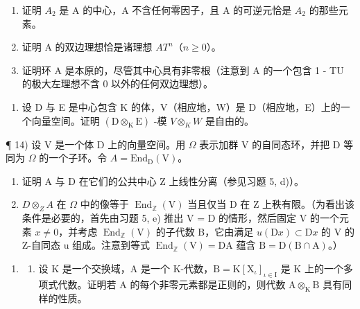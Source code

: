 \begin{enumerate}
\def\labelenumi{\alph{enumi})}
\item
  证明 \(A_{2}\) 是 A 的中心，A 不含任何零因子，且 A 的可逆元恰是 \(A_{2}\) 的那些元素。
\item
  证明 A 的双边理想恰是诸理想 \(AT^{n}\)（\(n \geqslant 0\)）。
\item
  证明环 A 是本原的，尽管其中心具有非零根（注意到 A 的一个包含 1 - TU 的极大左理想不含 0 以外的任何双边理想）。
\end{enumerate}

\begin{enumerate}
\def\labelenumi{\arabic{enumi})}
\setcounter{enumi}{12}
\tightlist
\item
  设 D 与 E 是中心包含 K 的体，V（相应地，W）是 D（相应地，E）上的一个向量空间。证明 \((\mathrm{D} \otimes_{\mathrm{K}} \mathrm{E})\) -模 \(V \otimes_{K} W\) 是自由的。
\end{enumerate}

¶ 14) 设 V 是一个体 D 上的向量空间。用 \(\Omega\) 表示加群 V 的自同态环，并把 D 等同为 \(\Omega\) 的一个子环。令 \(A = \text{End}_{\text{D}}(\text{V})\)。

\begin{enumerate}
\def\labelenumi{\alph{enumi})}
\item
  证明 A 与 D 在它们的公共中心 Z 上线性分离（参见习题 5, d)）。
\item
  \(D \otimes_{Z} A\) 在 \(\Omega\) 中的像等于 \(\operatorname{End}_{\mathbb{Z}}(\mathrm{V})\) 当且仅当 D 在 Z 上秩有限。（为看出该条件是必要的，首先由习题 5, e) 推出 V = D 的情形，然后固定 V 的一个元素 \(x \neq 0\)，并考虑 \(\operatorname{End}_{\mathbb{Z}}(\mathrm{V})\) 的子代数 B，它由满足 \(u(\mathrm{D}x) \subset \mathrm{D}x\) 的 V 的 Z-自同态 u 组成。注意到等式 \(\operatorname{End}_{\mathbb{Z}}(\mathrm{V}) = \mathrm{DA}\) 蕴含 \(\mathrm{B} = \mathrm{D}(\mathrm{B} \cap \mathrm{A})\)。）
\end{enumerate}

\begin{enumerate}
\def\labelenumi{\arabic{enumi})}
\setcounter{enumi}{14}
\tightlist
\item
  \begin{enumerate}
  \def\labelenumii{\alph{enumii})}
  \tightlist
  \item
    设 \(\mathrm{K}\) 是一个交换域，A 是一个 K-代数，\(\mathrm{B} = \mathrm{K}[\mathrm{X}_{\iota}]_{\iota \in \mathrm{I}}\) 是 \(\mathrm{K}\) 上的一个多项式代数。证明若 \(\mathrm{A}\) 的每个非零元素都是正则的，则代数 \(\mathrm{A} \otimes_{\mathrm{K}} \mathrm{B}\) 具有同样的性质。
  \end{enumerate}
\end{enumerate}

